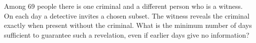 Among 69 people there is one criminal and a different person who is a witness. On each day a detective invites a chosen subset. The witness reveals the criminal exactly when present without the criminal. What is the minimum number of days sufficient to guarantee such a revelation, even if earlier days give no information?
